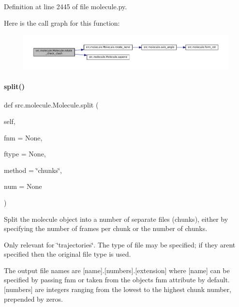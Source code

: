 Definition at line 2445 of file molecule.\+py.

Here is the call graph for this function\+:
\nopagebreak
\begin{figure}[H]
\begin{center}
\leavevmode
\includegraphics[width=350pt]{classsrc_1_1molecule_1_1Molecule_a011f4f4e9170d8f3c86adf61453142ce_cgraph}
\end{center}
\end{figure}
\mbox{\label{classsrc_1_1molecule_1_1Molecule_a004a64d4b979002026c23d15a79e8dfc}} 
\paragraph{\texorpdfstring{split()}{split()}}
{\footnotesize\ttfamily def src.\+molecule.\+Molecule.\+split (\begin{DoxyParamCaption}\item[{}]{self,  }\item[{}]{fnm = {\ttfamily None},  }\item[{}]{ftype = {\ttfamily None},  }\item[{}]{method = {\ttfamily \char`\"{}chunks\char`\"{}},  }\item[{}]{num = {\ttfamily None} }\end{DoxyParamCaption})}



Split the molecule object into a number of separate files (chunks), either by specifying the number of frames per chunk or the number of chunks. 

Only relevant for \char`\"{}trajectories\char`\"{}. The type of file may be specified; if they aren\textquotesingle{}t specified then the original file type is used.

The output file names are \mbox{[}name\mbox{]}.\mbox{[}numbers\mbox{]}.\mbox{[}extension\mbox{]} where \mbox{[}name\mbox{]} can be specified by passing \textquotesingle{}fnm\textquotesingle{} or taken from the object\textquotesingle{}s \textquotesingle{}fnm\textquotesingle{} attribute by default. \mbox{[}numbers\mbox{]} are integers ranging from the lowest to the highest chunk number, prepended by zeros.

